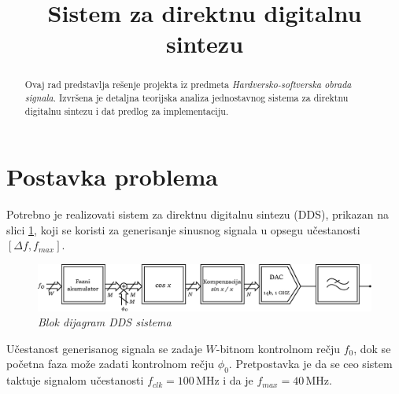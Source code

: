 \documentclass[conference]{IEEEtran}
\begin{document}
\title{Sistem za direktnu digitalnu sintezu}

\author{
\and
{}
}

\maketitle

\begin{abstract}
Ovaj rad predstavlja rešenje projekta iz predmeta \textsl{Hardversko-softverska obrada signala}. Izvršena je detaljna teorijska analiza jednostavnog sistema za direktnu digitalnu sintezu i dat predlog za implementaciju.
\end{abstract}
\section{Postavka problema}
Potrebno je realizovati sistem za direktnu digitalnu sintezu (DDS), prikazan na slici \ref{slika:dds}, koji se koristi za generisanje sinusnog signala u opsegu učestanosti $[\Delta f, f_{max}]$.

\begin{figure}[h]
	\centering
	\includegraphics[scale=0.43]{./slike/dds.eps}
	\caption{\textsl{Blok dijagram DDS sistema}}
	\label{slika:dds}
\end{figure}

Učestanost generisanog signala se zadaje $W$-bitnom kontrolnom rečju $f_0$, dok se početna faza može zadati kontrolnom rečju $\phi_0$. Pretpostavka je da se ceo sistem taktuje signalom učestanosti $f_{clk} = 100$\,MHz i da je $f_{max} = 40$\,MHz. \\
\end{document}
